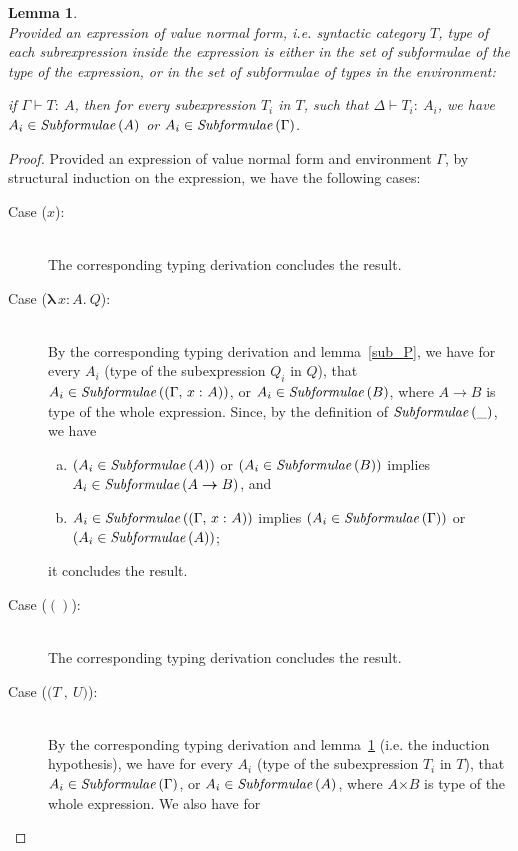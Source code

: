 \documentclass[a4paper]{article}
\newcommand{\typecolor}{}
\newcommand{\termcolor}{}
\newcommand{\tp}[1]{{\typecolor #1}}
\newcommand{\tm}[1]{{\termcolor #1}}
\newtheorem{lemma}[theorem]{Lemma}
\newcommand{\typarr}[2]{#1\boldsymbol{\rightarrow}#2}
\newcommand{\typprd}[2]{#1\boldsymbol{\times}#2}
\newcommand{\expvar}[1]{#1}
\newcommand{\expunt}{\boldsymbol{()}}
\newcommand{\expabs}[3]{\boldsymbol{\lambda}\,#1\boldsymbol{\colon}#2\boldsymbol{.}\ #3}
\newcommand{\expprd}[2]{\boldsymbol{(}#1\ \boldsymbol{,}\ #2\boldsymbol{)}}
\newcommand{\typing}[2]{\tm{#1:\ }\tp{#2}}
\newcommand{\typenvcon}[2]{\tp{\Gamma,}\ \typing{#1}{#2}}
\newcommand{\txt}[1]{\text{\textit{#1}}}
\newcommand{\subformulae}[1]{\txt{Subformulae}\,(#1)}
\begin{document}
\begin{lemma}\ \\
\label{sub_V}
Provided an expression of value normal form, i.e. syntactic
category $T$, type of each subrexpression inside the expression is
either in the set of subformulae of the type of the expression, or in
the set of subformulae of types in the environment:

 if $\Gamma \vdash \typing{T}{A}$, then for every subexpression $T_i$
 in $T$, such that $\Delta \vdash \typing{T_i}{A_i}$, we have $A_i \in
 \subformulae{A}$ or $A_i \in \subformulae{\Gamma}$. 
\end{lemma}
\begin{proof}
Provided an expression of value normal form and environment $\Gamma$,
by structural induction on the expression, we have the following cases:
\begin{description}
\item[Case ($\expvar{x}$):]\ \\ 
  The corresponding typing derivation concludes the result. 
\item[Case ($\expabs{x}{A}{Q}$):]\ \\ 
  By the corresponding typing derivation and lemma~\ref{sub_P}, we
  have for every $A_i$ (type of the subexpression $Q_i$ in $Q$), that
  $A_i \in \subformulae{(\typenvcon{x}{A})}$, or $A_i \in
  \subformulae{B}$, where $\typarr{A}{B}$ is type of the whole
  expression. Since, by the definition of $\subformulae{\_}$, we have
  \begin{enumerate}[(a)] 
     \item $(A_i \in \subformulae{A})$ or $(A_i \in \subformulae{B})$ implies $A_i \in \subformulae{\typarr{A}{B}}$, and
     \item $A_i \in \subformulae{(\typenvcon{x}{A})}$ implies $(A_i \in \subformulae{\Gamma})$ or $(A_i \in \subformulae{A})$;
  \end{enumerate}
  it concludes the result.
\item[Case ($\expunt$):]\ \\ 
  The corresponding typing derivation concludes the result. 
\item[Case ($\expprd{T}{U}$):]\ \\ 
  By the corresponding typing derivation and lemma~\ref{sub_V}
  (i.e. the induction hypothesis), we have for every $A_i$ (type of
  the subexpression $T_i$ in $T$), that $A_i \in
  \subformulae{\Gamma}$, or $A_i \in \subformulae{A}$, where
  $\typprd{A}{B}$ is type of the whole expression. We also have for

\end{description}
\end{proof}
\end{document}

